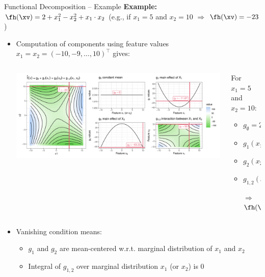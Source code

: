 \documentclass[11pt,compress,t,notes=noshow, aspectratio=169, xcolor=table]{beamer}
\newcommand{\open}{}
\newcommand{\close}{}
\begin{document}
\begin{frame}{Functional Decomposition -- Example}
\textbf{Example:} $\fh(\xv) = 2 + x_1^2 - x_2^2 + x_1 \cdot x_2$ (e.g., if $x_1 = 5$ and $x_2 = 10$ $\Rightarrow$ $\fh(\xv) = -23$)

\begin{itemize}
    \item Computation of components using feature values $x_1 = x_2 = (-10, -9, \ldots, 10)^\top$ gives:
    \begin{columns}[c, totalwidth=\linewidth]
    \begin{column}{0.75\textwidth}
        \includegraphics[width = \textwidth]{figure/interaction2}
    \end{column}
    \begin{column}{0.25\textwidth}
    For $x_1 = 5$ and $x_2 = 10$:\\
    \begin{itemize}
        \item $g_{\open \emptyset \close} = 2$
        \item $g_{\open 1 \close}(x_1) = -9.67$
        \item $g_{\open 2 \close}(x_2) = -65.33$
        \item $g_{\open 1,2 \close}(x_1, x_2) = 50$
        \item[$\Rightarrow$] $\fh(\xv) = -23$
    \end{itemize}
    \end{column}
    \end{columns}

    \item Vanishing condition means:
    \begin{itemize}
        \item $g_1$ and $g_2$ are mean-centered w.r.t. marginal distribution of $x_1$ and $x_2$
        \item Integral of $g_{1,2}$ over marginal distribution $x_1$ (or $x_2$) is 0
    \end{itemize}
\end{itemize} 
\end{frame}
\end{document}

